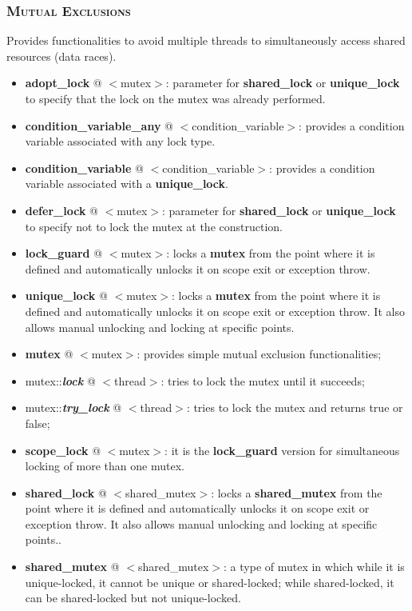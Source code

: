 \documentclass[10pt]{article}
\begin{document}
\begin{multicols*}{4}
{\subsubsection*{\textsc{Mutual Exclusions}}
\noindent
Provides functionalities to avoid multiple threads to simultaneously access shared resources (data races).
\begin{itemize}[leftmargin=*,topsep=0.25pt]
  \setlength\itemsep{-1.8pt}
\item  {\textbf{adopt\_lock}} @ $<$mutex$>$: parameter for {\textbf{shared\_lock}} or {\textbf{unique\_lock}} to specify that the lock on the mutex was already performed.
	\item  {{\textbf{condition\_variable\_any}}} @ $<$condition\_variable$>$: provides a condition variable associated with any lock type.
	\item  {{\textbf{condition\_variable}}} @ $<$condition\_variable$>$: provides a condition variable associated with a {\textbf{unique\_lock}}.
\item  {\textbf{defer\_lock}} @ $<$mutex$>$: parameter for {\textbf{shared\_lock}} or {\textbf{unique\_lock}} to specify not to lock the mutex at the construction.
	\item  \textbf{lock\_guard} @ $<$mutex$>$: locks a \textbf{mutex} from the point where it is defined and automatically unlocks it on scope exit or exception throw.
	\item  {{\textbf{unique\_lock}}} @ $<$mutex$>$: locks a \textbf{mutex} from the point where it is defined and automatically unlocks it on scope exit or exception throw. It also allows manual unlocking and locking at specific points.
	\item  {\textbf{mutex}} @ $<$mutex$>$: provides simple mutual exclusion functionalities;
	 \item  mutex::\emph{\textbf{lock}} @ $<$thread$>$: tries to lock the mutex until it succeeds;
	 \item  mutex::\emph{\textbf{try\_lock}} @ $<$thread$>$: tries to lock the mutex and returns true or false;
\item  {\textbf{scope\_lock}} @ $<$mutex$>$: it is the \textbf{lock\_guard} version for simultaneous locking of more than one mutex.
	\item  {\textbf{shared\_lock}} @ $<$shared\_mutex$>$: locks a \textbf{shared\_mutex} from the point where it is defined and automatically unlocks it on scope exit or exception throw. It also allows manual unlocking and locking at specific points..
	\item  \textbf{shared\_mutex} @ $<$shared\_mutex$>$: a type of mutex in which while it is unique-locked, it cannot be unique or shared-locked; while shared-locked, it can be shared-locked but not unique-locked.
\end{itemize}

}
\end{multicols*}
\end{document}
